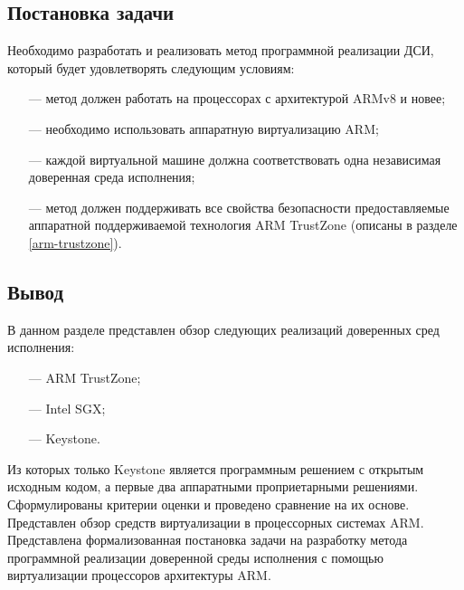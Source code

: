 \subsection{Постановка задачи}

Необходимо разработать и реализовать метод программной реализации ДСИ, который будет удовлетворять следующим условиям:

\begin{itemize}
	\item [---] метод должен работать на процессорах с архитектурой ARMv8 и новее;
	\item [---] необходимо использовать аппаратную виртуализацию ARM;
	\item [---] каждой виртуальной машине должна соответствовать одна независимая доверенная среда исполнения;
	\item [---] метод должен поддерживать все свойства безопасности предоставляемые аппаратной поддерживаемой технология ARM TrustZone (описаны в разделе \ref{arm-trustzone}).
\end{itemize}

\subsection*{Вывод}

В данном разделе представлен обзор следующих реализаций доверенных сред исполнения:

\begin{itemize}
	\item [---] ARM TrustZone;
	\item [---] Intel SGX;
	\item [---] Keystone.
\end{itemize}

Из которых только Keystone является программным решением с открытым исходным кодом, а первые два аппаратными проприетарными решениями.
Сформулированы критерии оценки и проведено сравнение на их основе. Представлен обзор средств виртуализации в процессорных системах ARM. Представлена формализованная постановка задачи на разработку метода программной реализации доверенной среды исполнения с помощью виртуализации процессоров архитектуры ARM.

\pagebreak

